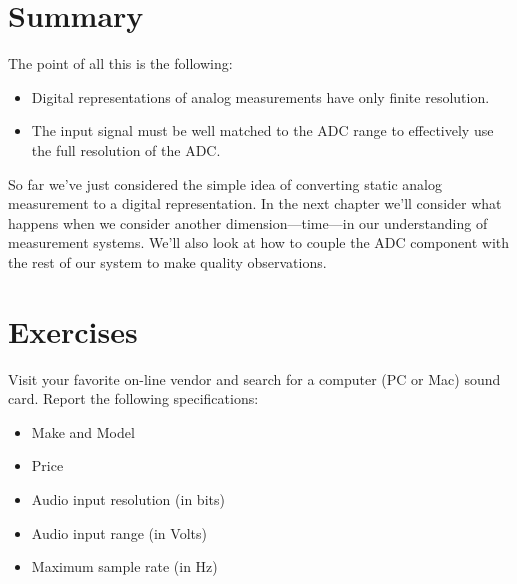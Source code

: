 \section{Summary}
The point of all this is the following:
\begin{itemize}
\item Digital representations of analog measurements have only finite resolution.
\item The input signal must be well matched to the ADC range to effectively use the full resolution of the ADC.  
\end{itemize}

So far we've just considered the simple idea of converting static analog measurement to a digital representation.  In the next chapter we'll consider what happens when we consider another dimension---time---in our understanding of measurement systems.  We'll also look at how to couple the ADC component with the rest of our system to make quality observations.

\section{Exercises}
\begin{ex}
Visit your favorite on-line vendor and search for a computer (PC or Mac) sound card.  Report the following specifications:
\begin{itemize}
\item Make and Model
\item Price
\item Audio input resolution (in bits)
\item Audio input range (in Volts)
\item Maximum sample rate (in Hz)
\end{itemize}
\end{ex}



